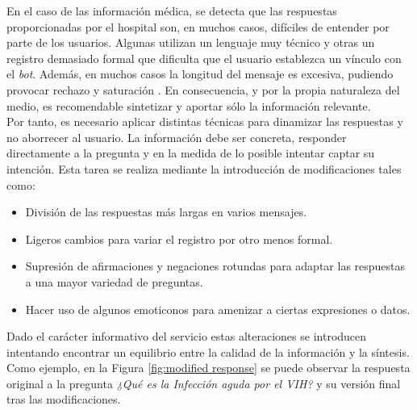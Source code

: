 En el caso de las información médica, se detecta que las respuestas proporcionadas por el hospital son, en muchos casos, difíciles de entender por parte de los usuarios. Algunas utilizan un lenguaje muy técnico y otras un registro demasiado formal que dificulta que el usuario establezca un vínculo con el \textit{bot}. Además, en muchos casos la longitud del mensaje es excesiva, pudiendo provocar rechazo y saturación \cite{shouldInteract}. En consecuencia, y por la propia naturaleza del medio, es recomendable sintetizar y aportar sólo la información relevante.\\

Por tanto, es necesario aplicar distintas técnicas para dinamizar las respuestas y no aborrecer al usuario. La información debe ser concreta, responder directamente a la pregunta y en la medida de lo posible intentar captar su intención. Esta tarea se realiza mediante la introducción de modificaciones tales como:

\begin{itemize}
	\item División de las respuestas más largas en varios mensajes.
	\item Ligeros cambios para variar el registro por otro menos formal.
	\item Supresión de afirmaciones y negaciones rotundas para adaptar las respuestas a una mayor variedad de preguntas.
	\item Hacer uso de algunos emoticonos para amenizar a ciertas expresiones o datos.
\end{itemize}

Dado el carácter informativo del servicio estas alteraciones se introducen intentando encontrar un equilibrio entre la calidad de la información y la síntesis. Como ejemplo, en la Figura \ref{fig:modified response} se puede observar la respuesta original a la pregunta \textit{¿Qué es la Infección aguda por el VIH?} y su versión final tras las modificaciones.


